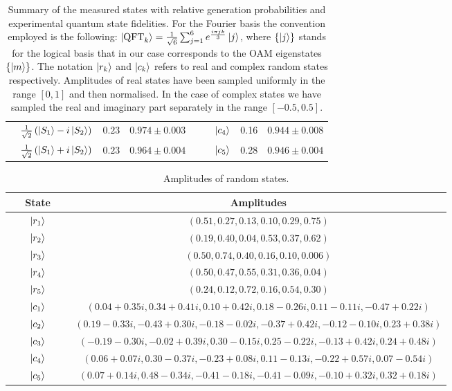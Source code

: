 \begin{table}[tbh]
\begin{tabular}{lcc|lcc}
$\quad\frac{1}{\sqrt{2}}\left(\ket{S_1}-i\ket{S_2}\right)$ & $0.23$ & $0.974 \pm 0.003\quad$&$\quad\ket{c_4}$ & 0.16 & $0.944\pm0.008$\\
$\quad\frac{1}{\sqrt{2}}\left(\ket{S_1}+i\ket{S_2}\right)$ & $0.23$ & $0.964 \pm 0.004\quad$& $\quad\ket{c_5}$ & 0.28 & $0.946\pm0.004$\\
\bottomrule
\end{tabular}
\caption{%
	Summary of the measured states with relative generation probabilities and experimental quantum state fidelities.
	For the Fourier basis the convention employed is the following: $\ket{\operatorname{QFT}_k}=\frac{1}{\sqrt{6}}\sum_{j=1}^{6}e^{\frac{ i \pi jk }{3}}\ket{j}$, where $\{\ket{j}\}$ stands for the logical basis that in our case corresponds to the \ac{OAM} eigenstates $\{\ket{m} \}$. The notation $\ket{r_k}$ and $\ket{c_k}$ refers to real and complex random states respectively. Amplitudes of real states have been sampled uniformly in the range $\left[0,1\right]$ and then normalised. In the case of complex states we have sampled the real and imaginary part separately in the range $\left[-0.5,0.5\right]$.
}
\label{table:expQWs:summary}
\end{table}

\begin{table}[tbh]
\centering\footnotesize
\begin{tabular}{cc}
\toprule
State & Amplitudes \\
\midrule
$\qquad\ket{r_1}\qquad$& $\left( 0.51, 0.27, 0.13, 0.10, 0.29, 0.75\right)$\\
$\qquad\ket{r_2}\qquad$& $\left( 0.19, 0.40, 0.04, 0.53, 0.37, 0.62\right)$\\
$\qquad\ket{r_3}\qquad$&$\left( 0.50, 0.74, 0.40, 0.16, 0.10, 0.006\right)$ \\
$\qquad\ket{r_4}\qquad$& $\left( 0.50, 0.47, 0.55, 0.31, 0.36, 0.04\right)$ \\
$\qquad\ket{r_5}\qquad$& $\left( 0.24, 0.12, 0.72, 0.16, 0.54, 0.30\right)$ \\
$\qquad\ket{c_1}\qquad$& $\left( 0.04+0.35i, 0.34+0.41i, 0.10+0.42i, 0.18-0.26i, 0.11-0.11i, -0.47+0.22i\right)$  \\
$\qquad\ket{c_2}\qquad$& $\left( 0.19-0.33i, -0.43+0.30i, -0.18-0.02i, -0.37+0.42i, -0.12-0.10i, 0.23+0.38i\right)$\\
$\qquad\ket{c_3}\qquad$& $\left( -0.19-0.30i, -0.02+0.39i, 0.30-0.15i, 0.25-0.22i, -0.13+0.42i, 0.24+0.48i\right)$\\
$\qquad\ket{c_4}\qquad$& $\left( 0.06+0.07i, 0.30-0.37i, -0.23+0.08i, 0.11-0.13i, -0.22+0.57i, 0.07-0.54i\right)$\\
$\qquad\ket{c_5}\qquad$& $\left( 0.07+0.14i, 0.48-0.34i, -0.41-0.18i, -0.41-0.09i, -0.10+0.32i, 0.32+0.18i\right)$\\
\bottomrule
\end{tabular}
\caption{Amplitudes of random states.}
\label{table:expQWs:random_states_amps}
\end{table}

